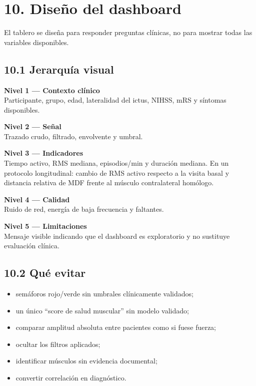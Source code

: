 \documentclass[
  spanish,
  a4paper,
  DIV=11,
  numbers=noendperiod]{scrreprt}
\providecommand{\tightlist}{%
  \setlength{\itemsep}{0pt}\setlength{\parskip}{0pt}}
\begin{document}
\chapter{10. Diseño del dashboard}\label{diseuxf1o-del-dashboard}

El tablero se diseña para responder preguntas clínicas, no para mostrar
todas las variables disponibles.

\section{10.1 Jerarquía visual}\label{jerarquuxeda-visual}

\textbf{Nivel 1 --- Contexto clínico}\\
Participante, grupo, edad, lateralidad del ictus, NIHSS, mRS y síntomas
disponibles.

\textbf{Nivel 2 --- Señal}\\
Trazado crudo, filtrado, envolvente y umbral.

\textbf{Nivel 3 --- Indicadores}\\
Tiempo activo, RMS mediana, episodios/min y duración mediana. En un
protocolo longitudinal: cambio de RMS activo respecto a la visita basal
y distancia relativa de MDF frente al músculo contralateral homólogo.

\textbf{Nivel 4 --- Calidad}\\
Ruido de red, energía de baja frecuencia y faltantes.

\textbf{Nivel 5 --- Limitaciones}\\
Mensaje visible indicando que el dashboard es exploratorio y no
sustituye evaluación clínica.

\section{10.2 Qué evitar}\label{quuxe9-evitar}

\begin{itemize}
\tightlist
\item
  semáforos rojo/verde sin umbrales clínicamente validados;
\item
  un único ``score de salud muscular'' sin modelo validado;
\item
  comparar amplitud absoluta entre pacientes como si fuese fuerza;
\item
  ocultar los filtros aplicados;
\item
  identificar músculos sin evidencia documental;
\item
  convertir correlación en diagnóstico.
\end{itemize}
\end{document}
